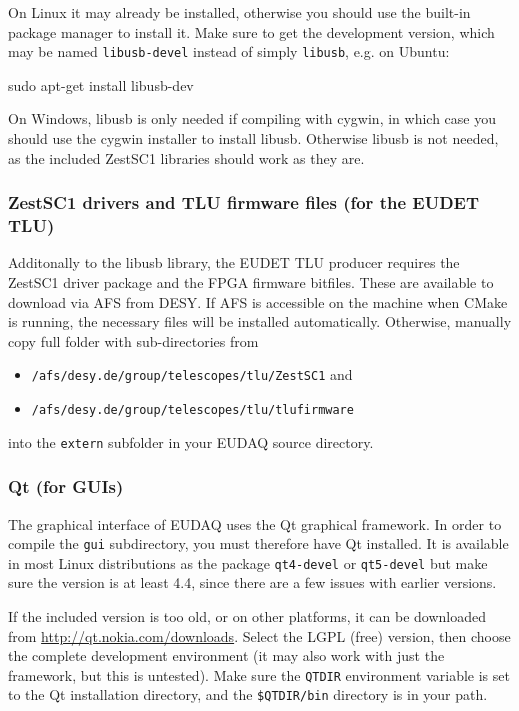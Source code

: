 On Linux it may already be installed,
otherwise you should use the built-in package manager to install it.
Make sure to get the development version, which may be named \texttt{libusb-devel} instead of simply \texttt{libusb}, e.g. on Ubuntu: 
\begin{listing}[mybash]
sudo apt-get install libusb-dev 
\end{listing}

On Windows, libusb is only needed if compiling with cygwin,
in which case you should use the cygwin installer to install libusb.
Otherwise libusb is not needed, as the included ZestSC1 libraries should work as they are.

\subsubsection{ZestSC1 drivers and TLU firmware files (for the EUDET TLU)}
Additonally to the libusb library, the EUDET \gls{TLU} producer requires the
ZestSC1 driver package and the FPGA firmware bitfiles. 
These are available to download via AFS from DESY. 
If AFS is accessible on the machine when CMake is running, the necessary files will be installed automatically.
Otherwise, manually copy full folder with sub-directories from
\begin{itemize}
\item \texttt{/afs/desy.de/group/telescopes/tlu/ZestSC1} and
\item \texttt{/afs/desy.de/group/telescopes/tlu/tlufirmware}
\end{itemize}
into the \texttt{extern} subfolder in your EUDAQ source directory.


\subsubsection{Qt (for GUIs)}
The graphical interface of EUDAQ uses the Qt graphical framework.
In order to compile the \texttt{gui} subdirectory, you must therefore have Qt installed.
It is available in most Linux distributions as the package \texttt{qt4-devel} or  \texttt{qt5-devel}
but make sure the version is at least 4.4, since there are a few issues with earlier versions.

If the included version is too old, or on other platforms,
it can be downloaded from \url{http://qt.nokia.com/downloads}.
Select the LGPL (free) version, then choose the complete development environment
(it may also work with just the framework, but this is untested).
Make sure the \texttt{QTDIR} environment variable is set to the Qt installation directory,
and the \texttt{\$QTDIR/bin} directory is in your path.

